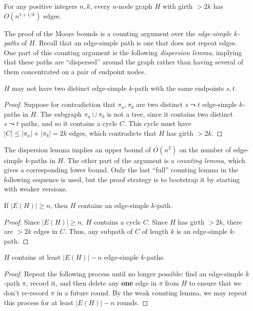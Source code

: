 \documentclass{theoretics}
\begin{document}
\begin{theorem} 
For any positive integers $n, k$, every $n$-node graph $H$ with girth $>2k$ has $O(n^{1+1/k})$ edges.
\end{theorem}

The proof of the Moore bounds is a counting argument over the \emph{edge-simple $k$-paths} of $H$.
Recall that an edge-simple path is one that does not repeat edges.
One part of this counting argument is the following \emph{dispersion lemma}, implying that these paths are ``dispersed'' around the graph rather than having several of them concentrated on a pair of endpoint nodes.

\begin{lemma} 
$H$ may not have two distinct edge-simple $k$-path with the same endpoints $s, t$.
\end{lemma}
\begin{proof}
Suppose for contradiction that $\pi_a, \pi_b$ are two distinct $s \leadsto t$ edge-simple $k$-paths in $H$.
The subgraph $\pi_a \cup \pi_b$ is not a tree, since it contains two distinct $s \leadsto t$ paths, and so it contains a cycle $C$.
This cycle must have $|C| \le |\pi_a| + |\pi_b| = 2k$ edges, which contradicts that $H$ has girth $>2k$.
\end{proof}

The dispersion lemma implies an upper bound of $O(n^2)$ on the number of edge-simple $k$-paths in $H$.
The other part of the argument is a \emph{counting lemma}, which gives a corresponding lower bound.
Only the last ``full'' counting lemma in the following sequence is used, but the proof strategy is to bootstrap it by starting with weaker versions.

\begin{lemma} 
If $|E(H)| \ge n$, then $H$ contains an edge-simple $k$-path.
\end{lemma}
\begin{proof}
Since $|E(H)| \ge n$, $H$ contains a cycle $C$.
Since $H$ has girth $>2k$, there are $>2k$ edges in $C$.
Thus, any subpath of $C$ of length $k$ is an edge-simple $k$-path.
\end{proof}


\begin{lemma} 
$H$ contains at least $|E(H)| - n$ edge-simple $k$-paths.
\end{lemma}
\begin{proof}
Repeat the following process until no longer possible: find an edge-simple $k$-path $\pi$, record it, and then delete any \textbf{one} edge in $\pi$ from $H$ to ensure that we don't re-record $\pi$ in a future round.
By the weak counting lemma, we may repeat this process for at least $|E(H)| - n$ rounds.
\end{proof}
\end{document}
